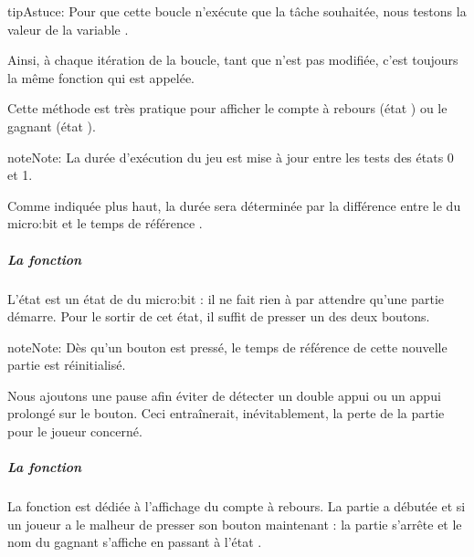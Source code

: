 \documentclass[letterpaper,10pt,french]{sphinxmanual}
\begin{document}
\noindent{}

\begin{sphinxadmonition}{tip}{Astuce:}
Pour que cette boucle n’exécute que la tâche souhaitée, nous
testons la valeur de la variable .

Ainsi, à chaque itération de la boucle, tant que  n’est pas
modifiée, c’est toujours la même fonction qui est appelée.

Cette méthode est très pratique pour afficher le compte à rebours
(état ) ou le gagnant (état ).
\end{sphinxadmonition}

\begin{sphinxadmonition}{note}{Note:}
La durée d’exécution du jeu est mise à jour entre les tests des
états 0 et 1.

Comme indiquée plus haut, la durée sera déterminée par
la différence entre le  du micro:bit
et le temps de référence .
\end{sphinxadmonition}


\subparagraph{La fonction }
\label{\detokenize{projets/goFast-bloc-coder:la-fonction-etat-0}}
L’état  est un état de  du micro:bit : il ne fait rien
à par attendre qu’une partie démarre. Pour le sortir de cet état,
il suffit de presser un des deux boutons.

\noindent{}

\begin{sphinxadmonition}{note}{Note:}
Dès qu’un bouton est pressé, le temps de référence de cette
nouvelle partie est réinitialisé.

Nous ajoutons une pause afin éviter de détecter un double appui
ou un appui prolongé sur le bouton. Ceci entraînerait, inévitablement,
la perte de la partie pour le joueur concerné.
\end{sphinxadmonition}


\subparagraph{La fonction }
\label{\detokenize{projets/goFast-bloc-coder:la-fonction-etat-1}}
La fonction  est dédiée à l’affichage du compte à rebours.
La partie a débutée et si un joueur a le malheur de presser son
bouton maintenant : la partie s’arrête et le nom du gagnant s’affiche
en passant à l’état .
\end{document}
